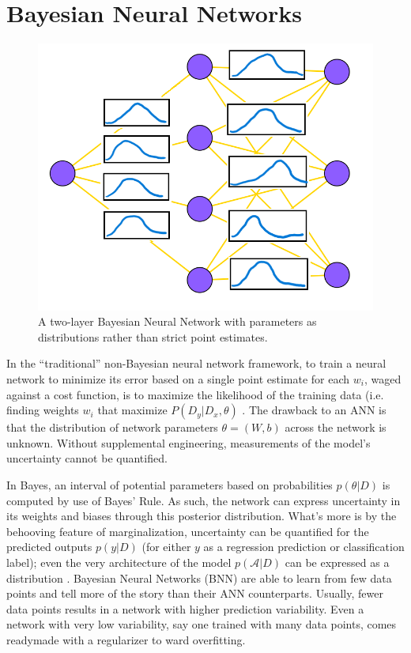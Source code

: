 \chapter{Bayesian Neural Networks}

\begin{figure}
  \vspace{-40pt}
    \centering
    \includegraphics[width=.35\textwidth]{Figures/BNN_weightstoc.png}
    \caption{\footnotesize{A two-layer Bayesian Neural Network with parameters as distributions rather than strict point estimates.}}
  \label{BayesNet}
  \vspace{-10pt}
\end{figure}

 In the ``traditional'' non-Bayesian neural network framework, to train a neural network to minimize its error based on a single point estimate for each $w_i$, waged against a cost function, is to maximize the likelihood of the training data (i.e. finding weights $w_i$ that maximize $P(D_y|D_x,\theta)$ \cite{bishop1995} \cite{bishop1997bayesian}.  The drawback to an ANN is that the distribution of network parameters $\theta = (W,b)$ across the network is unknown. \cite{mullachery2018bayesian}  Without supplemental engineering, measurements of the model's uncertainty cannot be quantified.
 
 In Bayes, an interval of potential parameters based on probabilities $p(\theta|D)$ is computed by use of Bayes’ Rule.  As such, the network can express uncertainty in its weights and biases through this posterior distribution. What's more is by the behooving feature of marginalization, uncertainty can be quantified for the predicted outputs $p(y|D)$ (for either $y$ as a regression prediction or classification label); even the very architecture of the model $p(\mathcal{A}|D)$ can be expressed as a distribution \cite{bishop1995}.
 Bayesian Neural Networks (BNN) are able to learn from few data points and tell more of the story than their ANN counterparts.  Usually, fewer data points results in a network with higher prediction variability.  Even a network with very low variability, say one trained with many data points, comes readymade with a regularizer to ward overfitting. \cite{vladimirova2019understanding}
 

